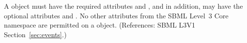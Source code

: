 A \Trigger object must have the required attributes
 and , and in addition, may have the
optional attributes  and .  No other
attributes from the SBML Level~3 Core namespace are permitted on a \Trigger
object.  (References: SBML L3V1 Section~\ref{sec:events}.)
